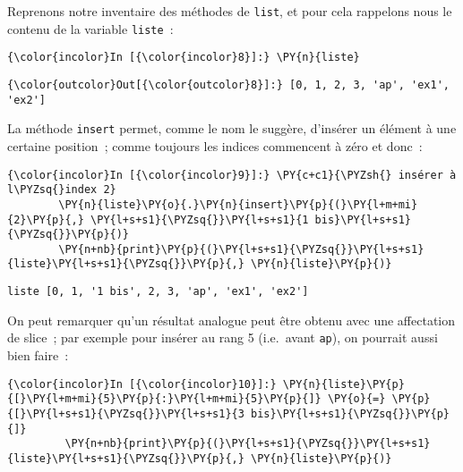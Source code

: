     Reprenons notre inventaire des méthodes de \texttt{list}, et pour cela
rappelons nous le contenu de la variable \texttt{liste}~:

    \begin{Verbatim}[commandchars=\\\{\}]
{\color{incolor}In [{\color{incolor}8}]:} \PY{n}{liste}
\end{Verbatim}


\begin{Verbatim}[commandchars=\\\{\}]
{\color{outcolor}Out[{\color{outcolor}8}]:} [0, 1, 2, 3, 'ap', 'ex1', 'ex2']
\end{Verbatim}
            
    La méthode \texttt{insert} permet, comme le nom le suggère, d'insérer un
élément à une certaine position~; comme toujours les indices commencent
à zéro et donc~:

    \begin{Verbatim}[commandchars=\\\{\}]
{\color{incolor}In [{\color{incolor}9}]:} \PY{c+c1}{\PYZsh{} insérer à l\PYZsq{}index 2}
        \PY{n}{liste}\PY{o}{.}\PY{n}{insert}\PY{p}{(}\PY{l+m+mi}{2}\PY{p}{,} \PY{l+s+s1}{\PYZsq{}}\PY{l+s+s1}{1 bis}\PY{l+s+s1}{\PYZsq{}}\PY{p}{)}
        \PY{n+nb}{print}\PY{p}{(}\PY{l+s+s1}{\PYZsq{}}\PY{l+s+s1}{liste}\PY{l+s+s1}{\PYZsq{}}\PY{p}{,} \PY{n}{liste}\PY{p}{)}
\end{Verbatim}


    \begin{Verbatim}[commandchars=\\\{\}]
liste [0, 1, '1 bis', 2, 3, 'ap', 'ex1', 'ex2']

    \end{Verbatim}

    On peut remarquer qu'un résultat analogue peut être obtenu avec une
affectation de slice~; par exemple pour insérer au rang 5 (i.e.~avant
\texttt{ap}), on pourrait aussi bien faire~:

    \begin{Verbatim}[commandchars=\\\{\}]
{\color{incolor}In [{\color{incolor}10}]:} \PY{n}{liste}\PY{p}{[}\PY{l+m+mi}{5}\PY{p}{:}\PY{l+m+mi}{5}\PY{p}{]} \PY{o}{=} \PY{p}{[}\PY{l+s+s1}{\PYZsq{}}\PY{l+s+s1}{3 bis}\PY{l+s+s1}{\PYZsq{}}\PY{p}{]}
         \PY{n+nb}{print}\PY{p}{(}\PY{l+s+s1}{\PYZsq{}}\PY{l+s+s1}{liste}\PY{l+s+s1}{\PYZsq{}}\PY{p}{,} \PY{n}{liste}\PY{p}{)}
\end{Verbatim}


